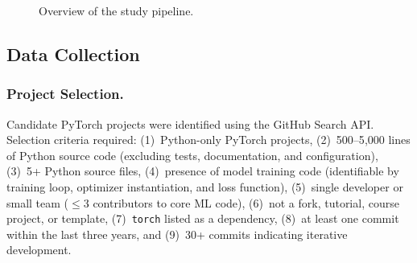 \documentclass[smallextended,natbib]{svjour3}
\begin{document}
\begin{figure}[t]
\centering
{}
\caption{Overview of the study pipeline.}
\label{fig:pipeline}
\end{figure}


\subsection{Data Collection}

\subsubsection{Project Selection.}
Candidate PyTorch projects were identified using the GitHub Search API. Selection criteria required: (1)~Python-only PyTorch projects, (2)~500--5{,}000 lines of Python source code (excluding tests, documentation, and configuration), (3)~5+ Python source files, (4)~presence of model training code (identifiable by training loop, optimizer instantiation, and loss function), (5)~single developer or small team ($\leq$3 contributors to core ML code), (6)~not a fork, tutorial, course project, or template, (7)~\texttt{torch} listed as a dependency, (8)~at least one commit within the last three years, and (9)~30+ commits indicating iterative development.
\end{document}
